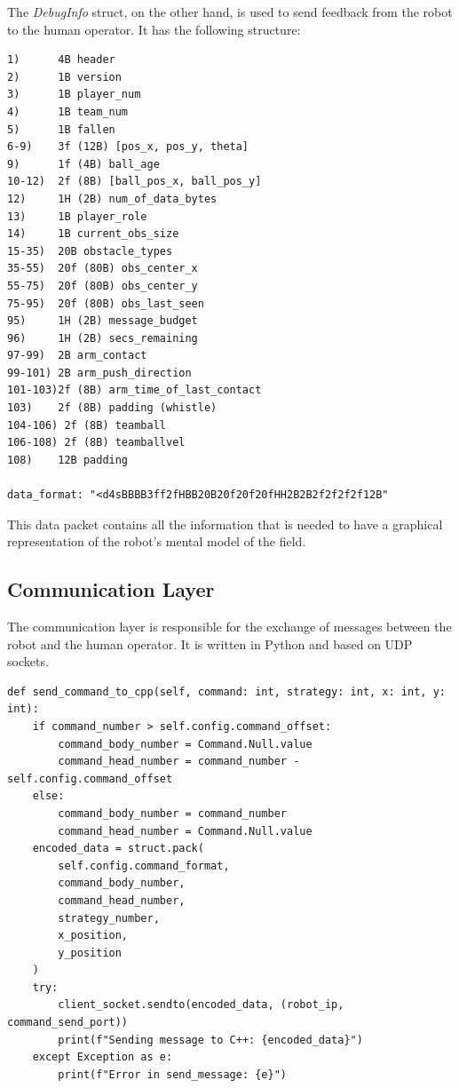 \documentclass[a4paper, onecolumn, 12pt]{article}
\begin{document}
The \textit{DebugInfo} struct, on the other hand, is used to send feedback from
the robot to the human operator. It has the following structure:

\begin{verbatim}
1)      4B header
2)      1B version
3)      1B player_num
4)      1B team_num
5)      1B fallen
6-9)    3f (12B) [pos_x, pos_y, theta]
9)      1f (4B) ball_age
10-12)  2f (8B) [ball_pos_x, ball_pos_y]
12)     1H (2B) num_of_data_bytes
13)     1B player_role
14)     1B current_obs_size
15-35)  20B obstacle_types  
35-55)  20f (80B) obs_center_x
55-75)  20f (80B) obs_center_y
75-95)  20f (80B) obs_last_seen
95)     1H (2B) message_budget
96)     1H (2B) secs_remaining
97-99)  2B arm_contact
99-101) 2B arm_push_direction
101-103)2f (8B) arm_time_of_last_contact
103)    2f (8B) padding (whistle)
104-106) 2f (8B) teamball
106-108) 2f (8B) teamballvel
108)    12B padding

data_format: "<d4sBBBB3ff2fHBB20B20f20f20fHH2B2B2f2f2f2f12B"
\end{verbatim}

This data packet contains all the information that is needed to have a graphical
representation of the robot's mental model of the field. 

\subsection{Communication Layer}

The communication layer is responsible for the exchange of messages between the
robot and the human operator. It is written in Python and based on UDP sockets. 

\begin{verbatim}
def send_command_to_cpp(self, command: int, strategy: int, x: int, y: int):
    if command_number > self.config.command_offset:
        command_body_number = Command.Null.value
        command_head_number = command_number - self.config.command_offset
    else:
        command_body_number = command_number
        command_head_number = Command.Null.value
    encoded_data = struct.pack(
        self.config.command_format,
        command_body_number,
        command_head_number,
        strategy_number,
        x_position,
        y_position
    )
    try:
        client_socket.sendto(encoded_data, (robot_ip, command_send_port))
        print(f"Sending message to C++: {encoded_data}")
    except Exception as e:
        print(f"Error in send_message: {e}")
\end{verbatim}
\end{document}
